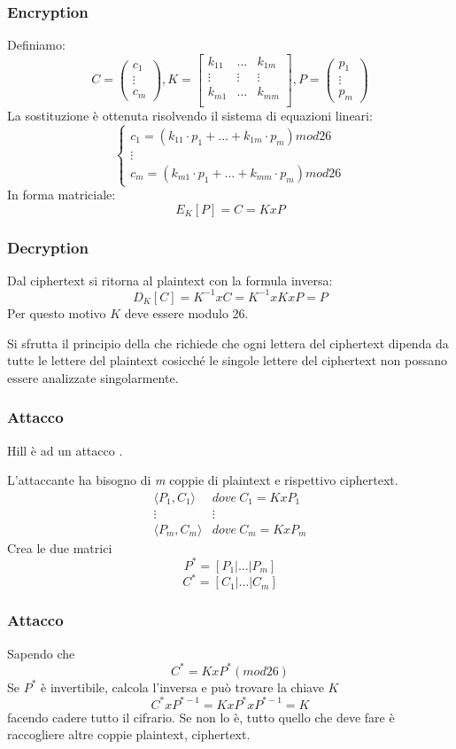 		\begin{frame}
			\frametitle{Encryption}	
			Definiamo:
			$$C = 
			\left(\begin{matrix}
			c_1\\
			\vdots\\
			c_m
			\end{matrix}\right),
			K = 
			\left[\begin{matrix}
			k_{11} & \dots & k_{1m}\\
			\vdots & \vdots & \vdots\\
			k_{m1} & \dots & k_{mm}\\
			\end{matrix}\right],
			P = 
			\left(\begin{matrix}
			p_1\\
			\vdots\\
			p_m
			\end{matrix}\right)$$
			La sostituzione è ottenuta risolvendo il sistema di equazioni lineari:
			$$\begin{cases}
				c_1 = (k_{11}\cdot p_1 + \dots + k_{1m}\cdot p_m)mod 26\\
				\vdots\\
				c_m = (k_{m1}\cdot p_1 + \dots + k_{mm}\cdot p_m)mod 26
			\end{cases}$$	
			In forma matriciale:
			$$E_K[P] = C = KxP$$
		\end{frame}
		
		\begin{frame}
			\frametitle{Decryption}	
			Dal ciphertext si ritorna al plaintext con la formula inversa:
			$$D_K[C] = K^{-1}xC = K^{-1}xKxP = P$$
			Per questo motivo $K$ deve essere  modulo 26.
			\begin{block}{}
				Si sfrutta il principio della  che richiede che ogni lettera del ciphertext dipenda da tutte le lettere del plaintext cosicché le singole lettere del ciphertext non possano essere analizzate singolarmente.
			\end{block}
		\end{frame}
		
		\begin{frame}
			\frametitle{Attacco}	
			Hill è  ad un attacco \tblue{known plaintext}.
			
			L'attaccante ha bisogno di \emph{m} coppie di plaintext e rispettivo ciphertext.
			$$\begin{matrix}
				\langle P_1,C_1\rangle & dove \ C_1 = KxP_1\\
				\vdots & \vdots\\
				\langle P_m,C_m\rangle & dove \ C_m = KxP_m
			\end{matrix}$$
			Crea le due matrici 
			$$P^* = \left[P_1|\dots|P_m\right]$$
			$$C^* = \left[C_1|\dots|C_m\right]$$ 
		\end{frame}
		
		\begin{frame}
			\frametitle{Attacco}	
			Sapendo che
			$$C^* = KxP^*(mod 26)$$
			Se $P^*$ è invertibile, calcola l'inversa e può trovare la chiave $K$
			$$C^*xP^{*-1} = KxP^*xP^{*-1} = K$$
			facendo cadere tutto il cifrario.
			Se non lo è, tutto quello che deve fare è raccogliere altre coppie plaintext, ciphertext.
		\end{frame}